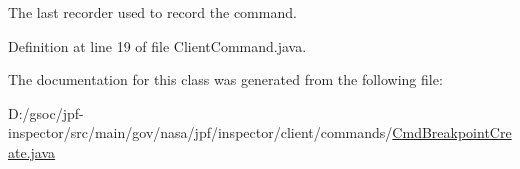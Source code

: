 The last recorder used to record the command. 



Definition at line 19 of file Client\+Command.\+java.



The documentation for this class was generated from the following file\+:\begin{DoxyCompactItemize}
\item 
D\+:/gsoc/jpf-\/inspector/src/main/gov/nasa/jpf/inspector/client/commands/\hyperlink{_cmd_breakpoint_create_8java}{Cmd\+Breakpoint\+Create.\+java}\end{DoxyCompactItemize}
